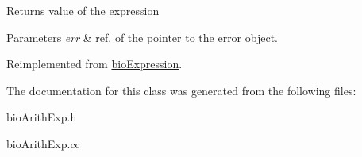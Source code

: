\begin{DoxyReturn}{Returns}
value of the expression 
\end{DoxyReturn}

\begin{DoxyParams}{Parameters}
{\em err} & ref. of the pointer to the error object. \\
\hline
\end{DoxyParams}


Reimplemented from \hyperlink{classbio_expression_af58662a5d4d456f15bc4f2c9bd4f8a5b}{bio\+Expression}.



The documentation for this class was generated from the following files\+:\begin{DoxyCompactItemize}
\item 
bio\+Arith\+Exp.\+h\item 
bio\+Arith\+Exp.\+cc\end{DoxyCompactItemize}
